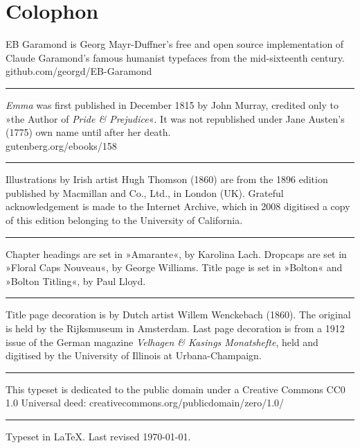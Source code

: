 \documentclass[
a5paper,
BCOR=7mm,
twoside,
DIV=calc,
11pt,
usegeometry,
chapterprefix,
headings=big,
numbers=noenddot,
listof=flat,
listof=nochaptergap]{scrbook}
\begin{document}


{}
\chapter*{Colophon}

\centering
EB Garamond is Georg Mayr-Duffner's free and open source implementation of Claude Garamond’s famous humanist typefaces from the mid-sixteenth century.\\github.com/georgd/EB-Garamond

\rule{0.5\textwidth}{.4pt}

\textit{Emma} was first published in December 1815 by John Murray, credited only to »the Author of \textit{Pride \& Prejudice}«. It was not republished under Jane Austen's (1775) own name until after her death.\\gutenberg.org/ebooks/158

\rule{0.5\textwidth}{.4pt}

Illustrations by Irish artist Hugh Thomson (1860) are from the 1896 edition published by Macmillan and Co., Ltd., in London (UK). Grateful acknowledgement is made to the Internet Archive, which in 2008 digitised a copy of this edition belonging to the University of California.

\rule{0.5\textwidth}{.4pt}

Chapter headings are set in »Amarante«, by Karolina Lach. Dropcaps are set in »Floral Caps Nouveau«, by George Williams. Title page is set in »Bolton« and »Bolton Titling«, by Paul Lloyd.

\rule{0.5\textwidth}{.4pt}

Title page decoration is by Dutch artist Willem Wenckebach (1860). The original is held by the Rijksmuseum in Amsterdam. Last page decoration is from a 1912 issue of the German magazine \textit{Velhagen \& Kasings Monatshefte}, held and digitised by the University of Illinois at Urbana-Champaign.

\rule{0.5\textwidth}{.4pt}


This typeset is dedicated to the public domain under a Creative Commons CC0 1.0 Universal deed: creativecommons.org/publicdomain/zero/1.0/\\

\rule{0.5\textwidth}{.4pt}

Typeset in \LaTeX{}. Last revised \today.
\enlargethispage{2\baselineskip}
\thispagestyle{empty}
\end{document}
